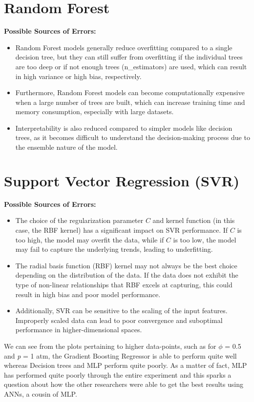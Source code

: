 \documentclass[12pt]{report}
\begin{document}
\section{Random Forest}
\textbf{Possible Sources of Errors:} 
\begin{itemize}
    \item Random Forest models generally reduce overfitting compared to a single decision tree, but they can still suffer from overfitting if the individual trees are too deep or if not enough trees (n\_estimators) are used, which can result in high variance or high bias, respectively.
    \item Furthermore, Random Forest models can become computationally expensive when a large number of trees are built, which can increase training time and memory consumption, especially with large datasets.
    \item Interpretability is also reduced compared to simpler models like decision trees, as it becomes difficult to understand the decision-making process due to the ensemble nature of the model.
\end{itemize}

\section{Support Vector Regression (SVR)}
\textbf{Possible Sources of Errors:} 
\begin{itemize}
    \item The choice of the regularization parameter \(C\) and kernel function (in this case, the RBF kernel) has a significant impact on SVR performance. If \(C\) is too high, the model may overfit the data, while if \(C\) is too low, the model may fail to capture the underlying trends, leading to underfitting.
    \item The radial basis function (RBF) kernel may not always be the best choice depending on the distribution of the data. If the data does not exhibit the type of non-linear relationships that RBF excels at capturing, this could result in high bias and poor model performance.
    \item Additionally, SVR can be sensitive to the scaling of the input features. Improperly scaled data can lead to poor convergence and suboptimal performance in higher-dimensional spaces.
\end{itemize}

We can see from the plots pertaining to higher data-points, such as for $\phi$ = 0.5 and \textit{p} = 1 atm, the Gradient Boosting Regressor is able to perform quite well whereas Decision trees and MLP perform quite poorly. As a matter of fact, MLP has performed quite poorly through the entire experiment and this sparks a question about how the other researchers were able to get the best results using ANNs, a cousin of MLP.
\end{document}
